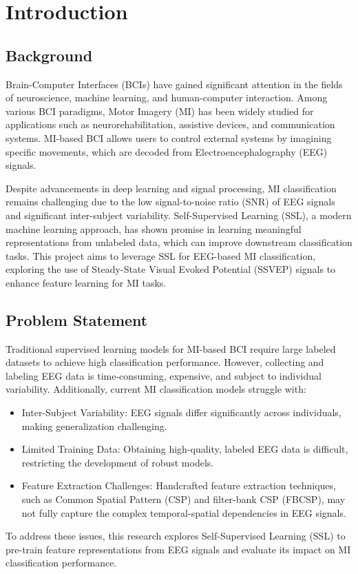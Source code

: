 \chapter{Introduction}
\label{chap:introduction}

\section{Background}
\label{section:background}

Brain-Computer Interfaces (BCIs) have gained significant attention in the fields of neuroscience, machine learning, and human-computer interaction. Among various BCI paradigms, Motor Imagery (MI) has been widely studied for applications such as neurorehabilitation, assistive devices, and communication systems. MI-based BCI allows users to control external systems by imagining specific movements, which are decoded from Electroencephalography (EEG) signals.

Despite advancements in deep learning and signal processing, MI classification remains challenging due to the low signal-to-noise ratio (SNR) of EEG signals and significant inter-subject variability. Self-Supervised Learning (SSL), a modern machine learning approach, has shown promise in learning meaningful representations from unlabeled data, which can improve downstream classification tasks. This project aims to leverage SSL for EEG-based MI classification, exploring the use of Steady-State Visual Evoked Potential (SSVEP) signals to enhance feature learning for MI tasks.

\section{Problem Statement}
\label{section:problem-statement}

Traditional supervised learning models for MI-based BCI require large labeled datasets to achieve high classification performance. However, collecting and labeling EEG data is time-consuming, expensive, and subject to individual variability. Additionally, current MI classification models struggle with:
\begin{itemize}
    \item Inter-Subject Variability: EEG signals differ significantly across individuals, making generalization challenging.
    \item Limited Training Data: Obtaining high-quality, labeled EEG data is difficult, restricting the development of robust models.
    \item Feature Extraction Challenges: Handcrafted feature extraction techniques, such as Common Spatial Pattern (CSP) and filter-bank CSP (FBCSP), may not fully capture the complex temporal-spatial dependencies in EEG signals.
\end{itemize}
To address these issues, this research explores Self-Supervised Learning (SSL) to pre-train feature representations from EEG signals and evaluate its impact on MI classification performance.

